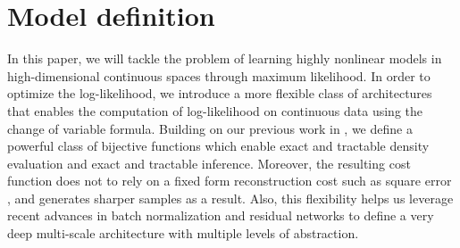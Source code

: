 \documentclass{article}
\newcommand{\jcom}[1]{\textcolor{darkgreen}{[jascha: #1]}}
\newcommand{\ldcom}[1]{\textcolor{blue}{[laurent: #1]}}
\begin{document}
\section{Model definition}
In this paper, we will tackle the problem of learning highly nonlinear models in high-dimensional continuous spaces through maximum likelihood. In order to optimize the log-likelihood, we introduce a more flexible class of architectures that enables the computation of log-likelihood on continuous data using the change of variable formula. Building on our previous work in \citep{dinh2014nice}, we define a powerful class of bijective functions which enable exact and tractable density evaluation and exact and tractable inference.
Moreover, the resulting cost function does not to rely on a fixed form reconstruction cost such as square error \citep{DBLP:journals/corr/LarsenSW15, DBLP:journals/corr/RadfordMC15}, and generates sharper samples as a result. Also, this flexibility helps us leverage recent advances in batch normalization \citep{ioffe2015batch} and residual networks \citep{DBLP:journals/corr/HeZRS15, DBLP:journals/corr/HeZR016} to define a very deep multi-scale architecture with multiple levels of abstraction.
\end{document}

